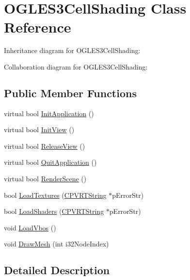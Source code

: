 \hypertarget{class_o_g_l_e_s3_cell_shading}{\section{O\+G\+L\+E\+S3\+Cell\+Shading Class Reference}
\label{class_o_g_l_e_s3_cell_shading}
}


Inheritance diagram for O\+G\+L\+E\+S3\+Cell\+Shading\+:


Collaboration diagram for O\+G\+L\+E\+S3\+Cell\+Shading\+:
\subsection*{Public Member Functions}
\begin{DoxyCompactItemize}
\item 
virtual bool \hyperlink{class_o_g_l_e_s3_cell_shading_a79e0ab13dcb13c64ef522163053ea053}{Init\+Application} ()
\item 
virtual bool \hyperlink{class_o_g_l_e_s3_cell_shading_a7dbab0e90de5e7766287fb47028b4b72}{Init\+View} ()
\item 
virtual bool \hyperlink{class_o_g_l_e_s3_cell_shading_a7fbe154f5f7e44dfbe7601402aa5ee37}{Release\+View} ()
\item 
virtual bool \hyperlink{class_o_g_l_e_s3_cell_shading_a2834e0dc702acfc66012728d635eee53}{Quit\+Application} ()
\item 
virtual bool \hyperlink{class_o_g_l_e_s3_cell_shading_a7de6eef1ea1d4861a8b7cebb1aac6a57}{Render\+Scene} ()
\item 
bool \hyperlink{class_o_g_l_e_s3_cell_shading_a1af22f8349bd9f44dee08cbaabf2f9f9}{Load\+Textures} (\hyperlink{class_c_p_v_r_t_string}{C\+P\+V\+R\+T\+String} $\ast$p\+Error\+Str)
\item 
bool \hyperlink{class_o_g_l_e_s3_cell_shading_a2989a1e79d635dff6ca068fe9aa96504}{Load\+Shaders} (\hyperlink{class_c_p_v_r_t_string}{C\+P\+V\+R\+T\+String} $\ast$p\+Error\+Str)
\item 
void \hyperlink{class_o_g_l_e_s3_cell_shading_a453a01d812fbd666c7acdeda7cc2b61c}{Load\+Vbos} ()
\item 
void \hyperlink{class_o_g_l_e_s3_cell_shading_af89d233db9e38f5acccd78f625e057fc}{Draw\+Mesh} (int i32\+Node\+Index)
\end{DoxyCompactItemize}


\subsection{Detailed Description}


